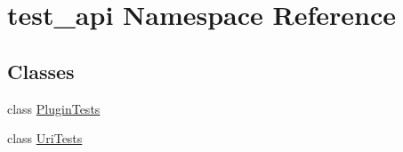 \hypertarget{namespacetest__api}{}\section{test\+\_\+api Namespace Reference}
\label{namespacetest__api}
\subsection*{Classes}
\begin{DoxyCompactItemize}
\item 
class \hyperlink{classtest__api_1_1_plugin_tests}{Plugin\+Tests}
\item 
class \hyperlink{classtest__api_1_1_uri_tests}{Uri\+Tests}
\end{DoxyCompactItemize}
